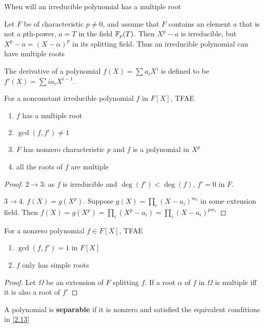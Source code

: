\documentclass[11pt]{article}
\begin{document}
When will an irreducible polynomial has a multiple root

\begin{examplle}[]
\label{2.11}
Let \(F\) be of characteristic \(p\neq 0\), and assume that \(F\) contains an element \(a\) that is
not a \(p\)th-power, \(a=T\) in the field \(\mathbb{F}_p(T)\). Then \(X^p-a\) is irreducible,
but \(X^p-a=(X-\alpha)^p\) in its splitting field. Thus an irreducible polynomial can have multiple roots
\end{examplle}

The derivative of a polynomial \(f(X)=\sum a_iX^i\) is defined to be \(f'(X)=\sum ia_iX^{i-1}\).

\begin{proposition}[]
\label{2.12}
For a nonconstant irreducible polynomial \(f\) in \(F[X]\), TFAE
\begin{enumerate}
\item \(f\) has a multiple root
\item \(\gcd(f,f')\neq 1\)
\item \(F\) has nonzero characteristic \(p\) and \(f\) is a polynomial in \(X^p\)
\item all the roots of \(f\) are multiple
\end{enumerate}
\end{proposition}

\begin{proof}
\(2\to 3\): as \(f\) is irreducible and \(\deg(f')<\deg(f)\), \(f'=0\) in \(F\).

\(3\to 4\). \(f(X)=g(X^p)\). Suppose \(g(X)=\prod_i(X-a_i)^{m_i}\) in some extension field. Then
\(f(X)=g(X^p)=\prod_i(X^p-a_i)=\prod_i(X-a_i)^{pm_i}\)
\end{proof}

\begin{proposition}[]
For a nonzero polynomial \(f\in F[X]\), TFAE
\label{2.13}
\begin{enumerate}
\item \(\gcd(f,f')=1\) in \(F[X]\)
\item \(f\) only has simple roots
\end{enumerate}
\end{proposition}

\begin{proof}
Let \(\Omega\) be an extension of \(F\) splitting \(f\). If a root \(\alpha\) of \(f\) in \(\Omega\) is multiple iff it is
also a root of \(f'\)
\end{proof}

\begin{definition}[]
A polynomial is \textbf{separable} if it is nonzero and satisfied the equivalent conditions in \ref{2.13}
\end{definition}
\end{document}
